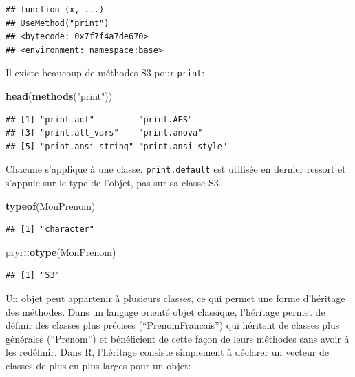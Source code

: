 \documentclass[
  12pt,
  french,
  a4paper,
  extrafontsizes,onecolumn,openright
  ]{memoir}
\newenvironment{Shaded}{\begin{snugshade}}{\end{snugshade}}
\newcommand{\KeywordTok}[1]{\textcolor[rgb]{0.13,0.29,0.53}{\textbf{#1}}}
\newcommand{\NormalTok}[1]{#1}
\newcommand{\OperatorTok}[1]{\textcolor[rgb]{0.81,0.36,0.00}{\textbf{#1}}}
\newcommand{\StringTok}[1]{\textcolor[rgb]{0.31,0.60,0.02}{#1}}
\begin{document}
\begin{verbatim}
## function (x, ...) 
## UseMethod("print")
## <bytecode: 0x7f7f4a7de670>
## <environment: namespace:base>
\end{verbatim}

\normalsize

Il existe beaucoup de méthodes S3 pour \texttt{print}:

\scriptsize

\begin{Shaded}
\begin{Highlighting}[]
\KeywordTok{head}\NormalTok{(}\KeywordTok{methods}\NormalTok{(}\StringTok{"print"}\NormalTok{))}
\end{Highlighting}
\end{Shaded}

\begin{verbatim}
## [1] "print.acf"         "print.AES"        
## [3] "print.all_vars"    "print.anova"      
## [5] "print.ansi_string" "print.ansi_style"
\end{verbatim}

\normalsize

Chacune s'applique à une classe. \texttt{print.default} est utilisée en dernier ressort et s'appuie sur le type de l'objet, pas sur sa classe S3.

\scriptsize

\begin{Shaded}
\begin{Highlighting}[]
\KeywordTok{typeof}\NormalTok{(MonPrenom)}
\end{Highlighting}
\end{Shaded}

\begin{verbatim}
## [1] "character"
\end{verbatim}

\begin{Shaded}
\begin{Highlighting}[]
\NormalTok{pryr}\OperatorTok{::}\KeywordTok{otype}\NormalTok{(MonPrenom)}
\end{Highlighting}
\end{Shaded}

\begin{verbatim}
## [1] "S3"
\end{verbatim}

\normalsize

Un objet peut appartenir à plusieurs classes, ce qui permet une forme d'héritage des méthodes.
Dans un langage orienté objet classique, l'héritage permet de définir des classes plus précises (\enquote{PrenomFrancais}) qui héritent de classes plus générales (\enquote{Prenom}) et bénéficient de cette façon de leurs méthodes sans avoir à les redéfinir.
Dans R, l'héritage consiste simplement à déclarer un vecteur de classes de plus en plus larges pour un objet:
\end{document}
